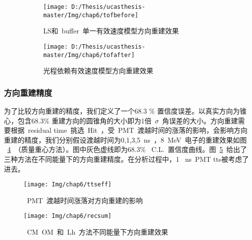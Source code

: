 \begin{figure}[!htbp]
  \centering
  \begin{subfigure}[b]{\MySubFactor\textwidth}
    \texttt{[image: D:/Thesis/ucasthesis-master/Img/chap6/tofbefore]}
    \caption{LS和~buffer~单一有效速度模型方向重建效果}
    \label{fig:tof_1}
  \end{subfigure}%
  \quad\quad\quad\quad\quad\quad%
  \begin{subfigure}[b]{\MySubFactor\textwidth}
    \texttt{[image: D:/Thesis/ucasthesis-master/Img/chap6/tofafter]}
    \caption{光程依赖有效速度模型方向重建效果}
    \label{fig:tof_2}
  \end{subfigure}
   \caption{}
  \label{fig:tof}
\end{figure}
\subsubsection{方向重建精度}
为了比较方向重建的精度，我们定义了一个68.3 \% 置信度误差。以真实方向为锥心，包含68.3\% 重建方向的圆锥角的大小即为1倍~$\sigma$~角误差的大小。方向重建需要根据~residual time~挑选~Hit~，受~PMT~渡越时间的涨落的影响，会影响方向重建的精度，我们分别假设渡越时间为0,1,3,5~ns~，8~MeV~电子的重建效果如图
~\ref{fig:ttseff}~（质量重心方法）。图中灰色虚线即为68.3\% ~C.L.~置信度曲线。图~\ref{fig:recsum}~给出了三种方法在不同能量下的方向重建精度。在分析过程中，1 ~ns~PMT tts被考虑了进去。
\begin{figure}[!htbp]
  \centering
   \texttt{[image: Img/chap6/ttseff]}
    \caption{~PMT~渡越时间涨落对方向重建的影响}
  \label{fig:ttseff}
\end{figure}

\begin{figure}[!htbp]
  \centering
   \texttt{[image: Img/chap6/recsum]}
    \caption{~CM~OM~和~Lh~方法不同能量下方向重建效果}
  \label{fig:recsum}
\end{figure}
